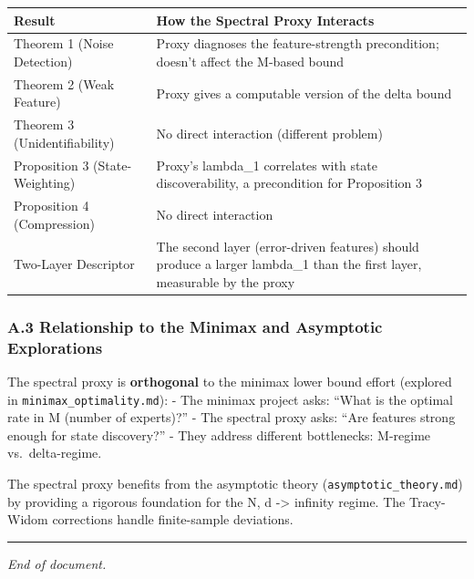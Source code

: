 \documentclass[
  12pt,
]{article}
\begin{document}
\begin{longtable}[]{@{}
  >{\raggedright\arraybackslash}p{}
  >{\raggedright\arraybackslash}p{}@{}}
\toprule\noalign{}
\begin{minipage}[b]{\linewidth}\raggedright
Result
\end{minipage} & \begin{minipage}[b]{\linewidth}\raggedright
How the Spectral Proxy Interacts
\end{minipage} \\
\midrule\noalign{}
\endhead
\bottomrule\noalign{}
\endlastfoot
Theorem 1 (Noise Detection) & Proxy diagnoses the feature-strength
precondition; doesn't affect the M-based bound \\
Theorem 2 (Weak Feature) & Proxy gives a computable version of the delta
bound \\
Theorem 3 (Unidentifiability) & No direct interaction (different
problem) \\
Proposition 3 (State-Weighting) & Proxy's lambda\_1 correlates with
state discoverability, a precondition for Proposition 3 \\
Proposition 4 (Compression) & No direct interaction \\
Two-Layer Descriptor & The second layer (error-driven features) should
produce a larger lambda\_1 than the first layer, measurable by the
proxy \\
\end{longtable}

\subsubsection{A.3 Relationship to the Minimax and Asymptotic
Explorations}\label{a.3-relationship-to-the-minimax-and-asymptotic-explorations}

The spectral proxy is \textbf{orthogonal} to the minimax lower bound
effort (explored in \texttt{minimax\_optimality.md}): - The minimax
project asks: ``What is the optimal rate in M (number of experts)?'' -
The spectral proxy asks: ``Are features strong enough for state
discovery?'' - They address different bottlenecks: M-regime
vs.~delta-regime.

The spectral proxy benefits from the asymptotic theory
(\texttt{asymptotic\_theory.md}) by providing a rigorous foundation for
the N, d -\textgreater{} infinity regime. The Tracy-Widom corrections
handle finite-sample deviations.

\begin{center}\rule{0.5\linewidth}{0.5pt}\end{center}

\emph{End of document.}
\end{document}
